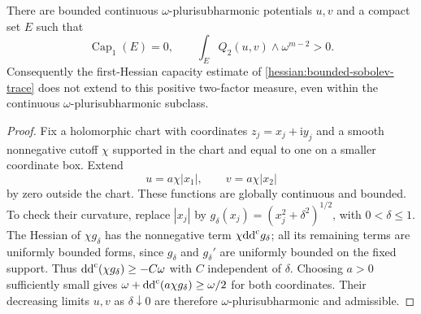 \begin{example}\label{hessian:sobolev-two-product-obstruction}
There are bounded continuous $\omega$-plurisubharmonic potentials
$u,v$ and a compact set $E$ such that
\[
 \operatorname{Cap}_1(E)=0,\qquad
 \int_E Q_2(u,v)\wedge\omega^{m-2}>0.
\]
Consequently the first-Hessian capacity estimate of
\cref{hessian:bounded-sobolev-trace} does not extend to
this positive two-factor measure, even within the continuous
$\omega$-plurisubharmonic subclass.
\end{example}
\begin{proof}
Fix a holomorphic chart with coordinates $z_j=x_j+\mathrm i y_j$ and a smooth
nonnegative cutoff $\chi$ supported in the chart and equal to one
on a smaller coordinate box. Extend
\[
 u=a\chi|x_1|,\qquad v=a\chi|x_2|
\]
by zero outside the chart. These functions are globally continuous
and bounded. To check their curvature, replace $|x_j|$ by
$g_\delta(x_j)=(x_j^2+\delta^2)^{1/2}$, with $0<\delta\leq1$.
The Hessian of $\chi g_\delta$ has the nonnegative term
$\chi\mathrm{dd}^{\mathrm{c}} g_\delta$; all its remaining terms are uniformly bounded
forms, since $g_\delta$ and $g_\delta'$ are uniformly bounded on the
fixed support. Thus $\mathrm{dd}^{\mathrm{c}}(\chi g_\delta)\geq-C\omega$ with $C$
independent of $\delta$. Choosing $a>0$ sufficiently small gives
$\omega+\mathrm{dd}^{\mathrm{c}}(a\chi g_\delta)\geq\omega/2$ for both coordinates.
Their decreasing limits $u,v$ as $\delta\downarrow0$ are therefore
$\omega$-plurisubharmonic and admissible.


\end{proof}
